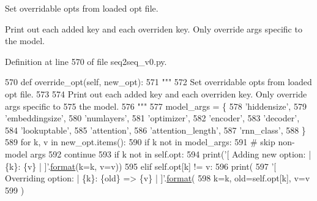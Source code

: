 \begin{DoxyVerb}Set overridable opts from loaded opt file.

Print out each added key and each overriden key. Only override args specific to
the model.
\end{DoxyVerb}
 

Definition at line 570 of file seq2seq\+\_\+v0.\+py.


\begin{DoxyCode}
570     \textcolor{keyword}{def }override\_opt(self, new\_opt):
571         \textcolor{stringliteral}{"""}
572 \textcolor{stringliteral}{        Set overridable opts from loaded opt file.}
573 \textcolor{stringliteral}{}
574 \textcolor{stringliteral}{        Print out each added key and each overriden key. Only override args specific to}
575 \textcolor{stringliteral}{        the model.}
576 \textcolor{stringliteral}{        """}
577         model\_args = \{
578             \textcolor{stringliteral}{'hiddensize'},
579             \textcolor{stringliteral}{'embeddingsize'},
580             \textcolor{stringliteral}{'numlayers'},
581             \textcolor{stringliteral}{'optimizer'},
582             \textcolor{stringliteral}{'encoder'},
583             \textcolor{stringliteral}{'decoder'},
584             \textcolor{stringliteral}{'lookuptable'},
585             \textcolor{stringliteral}{'attention'},
586             \textcolor{stringliteral}{'attention\_length'},
587             \textcolor{stringliteral}{'rnn\_class'},
588         \}
589         \textcolor{keywordflow}{for} k, v \textcolor{keywordflow}{in} new\_opt.items():
590             \textcolor{keywordflow}{if} k \textcolor{keywordflow}{not} \textcolor{keywordflow}{in} model\_args:
591                 \textcolor{comment}{# skip non-model args}
592                 \textcolor{keywordflow}{continue}
593             \textcolor{keywordflow}{if} k \textcolor{keywordflow}{not} \textcolor{keywordflow}{in} self.opt:
594                 print(\textcolor{stringliteral}{'[ Adding new option: | \{k\}: \{v\} | ]'}.\hyperlink{namespaceparlai_1_1chat__service_1_1services_1_1messenger_1_1shared__utils_a32e2e2022b824fbaf80c747160b52a76}{format}(k=k, v=v))
595             \textcolor{keywordflow}{elif} self.opt[k] != v:
596                 print(
597                     \textcolor{stringliteral}{'[ Overriding option: | \{k\}: \{old\} => \{v\} | ]'}.\hyperlink{namespaceparlai_1_1chat__service_1_1services_1_1messenger_1_1shared__utils_a32e2e2022b824fbaf80c747160b52a76}{format}(
598                         k=k, old=self.opt[k], v=v
599                     )

\end{DoxyCode}
